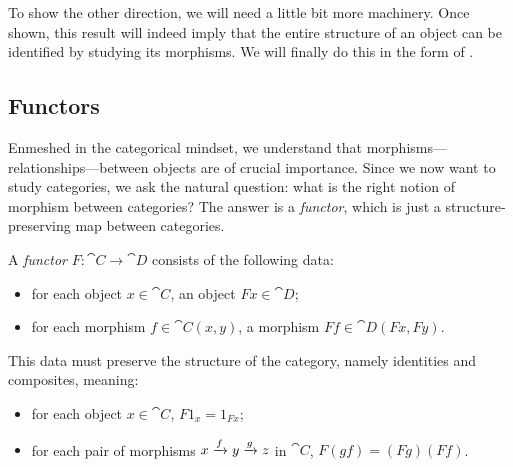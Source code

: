 To show the other direction,  we will need a little bit more machinery. Once
shown, this result will indeed imply that the entire structure of an object can
be identified by studying its morphisms. We will finally do this in the form of
.

\subsection{Functors}

Enmeshed in the categorical mindset, we understand that
morphisms---relationships---between objects are of crucial importance. Since we
now want to study categories, we ask the natural question: what is the right
notion of morphism between categories? The answer is a \emph{functor}, which is
just a structure-preserving map between categories.

\begin{dfn}[functor]\label{def:functor}
  A \emph{functor} $F: \cat{C}\to\cat{D}$ consists of the following data:
  \begin{itemize}
    \item for each object $x\in\cat{C}$, an object $Fx\in\cat{D}$;
    \item for each morphism $f\in\cat{C}(x, y)$, a morphism $Ff\in\cat{D}(Fx, Fy)$.
  \end{itemize}
  This data must preserve the structure of the category, namely identities and
  composites, meaning:
  \begin{itemize}
    \item for each object $x\in\cat{C}$, $F1_x = 1_{Fx}$;
    \item for each pair of morphisms $x\xrightarrow{f}y\xrightarrow{g} z$ in $\cat{C}$, $F(gf) =
      (Fg)(Ff)$.
  \end{itemize}
\end{dfn}

